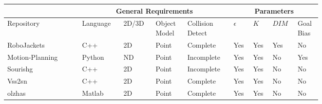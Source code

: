 
\begin{table}[H]
\begin{centering}
\begin{tabular}{|p{0.2\linewidth}|p{0.1\linewidth}|p{0.08\linewidth}|p{0.08\linewidth}|p{0.11\linewidth}|p{0.04\linewidth}|p{0.04\linewidth}|p{0.05\linewidth}|p{0.05\linewidth}|}
\hline
    & \multicolumn{4}{c|}{\textbf{General Requirements}} & \multicolumn{4}{c|}{\textbf{Parameters}} \\
\hline
Repository  & Language  &  2D/3D  & Object Model & Collision Detect& $\epsilon$ &  $K$ &  $DIM$ & Goal Bias \\
\hline
RoboJackets\cite{RoboJackets2019}  & 
    \textcolor{mygreen}{C++}    &  \textcolor{myred}{2D}    & \textcolor{myred}{Point} & \textcolor{mygreen}{Complete}&
    \textcolor{mygreen}{Yes} & \textcolor{mygreen}{Yes}  & \textcolor{mygreen}{Yes} & \textcolor{myred}{No}
    \\
\hline
Motion-Planning\cite{Planning2019} &
    \textcolor{myred}{Python}    &  \textcolor{mygreen}{ND}    & \textcolor{myred}{Point} & \textcolor{myred}{Incomplete} &
    \textcolor{mygreen}{Yes} & \textcolor{mygreen}{Yes}  & \textcolor{myred}{No} & \textcolor{mygreen}{Yes}
    \\
\hline
Sourishg\cite{Sourishg2017} &
    \textcolor{mygreen}{C++}    &  \textcolor{myred}{2D}    & \textcolor{myred}{Point} & \textcolor{myred}{Incomplete} &
    \textcolor{mygreen}{Yes} & \textcolor{mygreen}{Yes}  & \textcolor{myred}{No} & \textcolor{myred}{No}
    \\
\hline
Vss2sn\cite{Vss2sn2019} &
    \textcolor{mygreen}{C++}    &  \textcolor{myred}{2D}    & \textcolor{myred}{Point} & \textcolor{mygreen}{Complete} &
    \textcolor{mygreen}{Yes} & \textcolor{mygreen}{Yes}  & \textcolor{myred}{No} & \textcolor{myred}{No}
    \\
\hline
olzhas\cite{Olzhas2017} &
    \textcolor{myred}{Matlab}    &  \textcolor{myred}{2D}    & \textcolor{myred}{Point} & \textcolor{mygreen}{Complete} &
    \textcolor{mygreen}{Yes} & \textcolor{mygreen}{Yes}  & \textcolor{myred}{No} & \textcolor{myred}{No}
    \\
\hline
\end{tabular}
\end{centering}
\end{table}